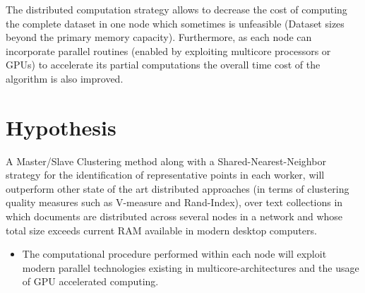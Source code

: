 \documentclass[10pt]{article}
\begin{document}
The distributed computation strategy allows to decrease the cost of computing the complete dataset in one node which sometimes is unfeasible (Dataset sizes beyond the primary memory capacity). Furthermore, as each node can incorporate parallel routines (enabled by exploiting multicore processors or GPUs) to accelerate its partial computations the overall time cost of the algorithm is also improved.

\section{Hypothesis}


A Master/Slave Clustering method along with a Shared-Nearest-Neighbor strategy for the identification of representative points in each worker, will outperform other state of the art distributed approaches (in terms of clustering quality measures such as V-measure and Rand-Index), over text collections in which documents are distributed across several nodes in a network and whose total size exceeds current RAM available in modern desktop computers.
\begin{itemize}
\item The computational procedure performed within each node will exploit modern parallel technologies existing in multicore-architectures and the usage of GPU accelerated computing.
\end{itemize}
\end{document}
